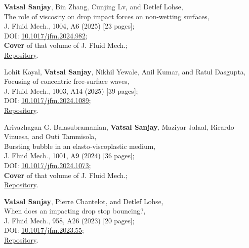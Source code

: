 \documentclass[10pt,a4paper,colorlinks,linkcolor=blue,urlcolor=blue,citecolor=blue]{moderncv}
\begin{document}
\begin{enumerate}[leftmargin=1.5em,label=\textbf{[\arabic*]}]
	\item \textbf{Vatsal Sanjay}, Bin Zhang, Cunjing Lv, and Detlef Lohse,\\
	The role of viscosity on drop impact forces on non-wetting surfaces,\\
	J. Fluid Mech., 1004, A6 (2025) [23 pages];\\
	\faFile\hspace{0.2em}DOI: \href{https://doi.org/10.1017/jfm.2024.982}{10.1017/jfm.2024.982};\\
	\faStar\hspace{0.2em}\textbf{Cover} of that volume of J. Fluid Mech.;\\
	\faGithub\hspace{0.2em}\href{https://github.com/VatsalSy/The-role-of-viscosity-on-drop-impact-forces}{Repository}.

	\item Lohit Kayal, \textbf{Vatsal Sanjay}, Nikhil Yewale, Anil Kumar, and Ratul Dasgupta,\\
	Focusing of concentric free-surface waves,\\
	J. Fluid Mech., 1003, A14 (2025) [39 pages];\\
	\faFile\hspace{0.2em}DOI: \href{https://doi.org/10.1017/jfm.2024.1089}{10.1017/jfm.2024.1089};\\
	\faGithub\hspace{0.2em}\href{https://github.com/comphy-lab/concentricWave}{Repository}.

	\item Arivazhagan G. Balasubramanian, \textbf{Vatsal Sanjay}, Maziyar Jalaal, Ricardo Vinuesa, and Outi Tammisola,\\
	Bursting bubble in an elasto-viscoplastic medium,\\
	J. Fluid Mech., 1001, A9 (2024) [36 pages];\\
	\faFile\hspace{0.2em}DOI: \href{https://doi.org/10.1017/jfm.2024.1073}{10.1017/jfm.2024.1073};\\
	\faStar\hspace{0.2em}\textbf{Cover} of that volume of J. Fluid Mech.;\\
	\faGithub\hspace{0.2em}\href{https://github.com/comphy-lab/2023_Bubble-bursting-in-an-elasto-viscoplastic-medium}{Repository}.

	\item \textbf{Vatsal Sanjay}, Pierre Chantelot, and Detlef Lohse,\\
	When does an impacting drop stop bouncing?,\\
	J. Fluid Mech., 958, A26 (2023) [20 pages];\\
	\faFile\hspace{0.2em}DOI: \href{https://doi.org/10.1017/jfm.2023.55}{10.1017/jfm.2023.55};\\
	\faGithub\hspace{0.2em}\href{https://github.com/comphy-lab/Drop-Impact}{Repository}.


\end{enumerate}
\end{document}
